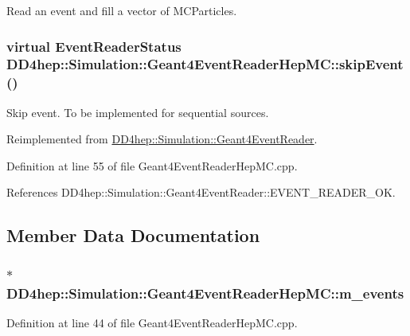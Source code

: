 Read an event and fill a vector of MCParticles. \hypertarget{class_d_d4hep_1_1_simulation_1_1_geant4_event_reader_hep_m_c_a02a4d905385f3b587ffe953e129aad5f}{
\subsubsection[{skipEvent}]{\setlength{\rightskip}{0pt plus 5cm}virtual {\bf EventReaderStatus} DD4hep::Simulation::Geant4EventReaderHepMC::skipEvent ()}}
\label{class_d_d4hep_1_1_simulation_1_1_geant4_event_reader_hep_m_c_a02a4d905385f3b587ffe953e129aad5f}


Skip event. To be implemented for sequential sources. 

Reimplemented from \hyperlink{class_d_d4hep_1_1_simulation_1_1_geant4_event_reader_a9381626ad4f4fa20e304414f6654ee03}{DD4hep::Simulation::Geant4EventReader}.

Definition at line 55 of file Geant4EventReaderHepMC.cpp.

References DD4hep::Simulation::Geant4EventReader::EVENT\_\-READER\_\-OK.

\subsection{Member Data Documentation}
\hypertarget{class_d_d4hep_1_1_simulation_1_1_geant4_event_reader_hep_m_c_a0e1d85baaaec0af5a18bb63ec3cdd20a}{
\subsubsection[{m\_\-events}]{$\ast$ {\bf DD4hep::Simulation::Geant4EventReaderHepMC::m\_\-events}}}
\label{class_d_d4hep_1_1_simulation_1_1_geant4_event_reader_hep_m_c_a0e1d85baaaec0af5a18bb63ec3cdd20a}


Definition at line 44 of file Geant4EventReaderHepMC.cpp.

